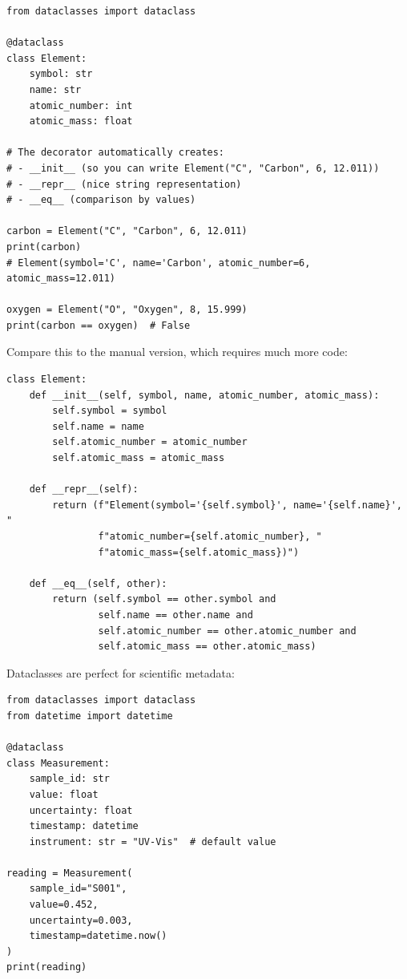 \begin{lstlisting}
from dataclasses import dataclass

@dataclass
class Element:
    symbol: str
    name: str
    atomic_number: int
    atomic_mass: float

# The decorator automatically creates:
# - __init__ (so you can write Element("C", "Carbon", 6, 12.011))
# - __repr__ (nice string representation)
# - __eq__ (comparison by values)

carbon = Element("C", "Carbon", 6, 12.011)
print(carbon)
# Element(symbol='C', name='Carbon', atomic_number=6, atomic_mass=12.011)

oxygen = Element("O", "Oxygen", 8, 15.999)
print(carbon == oxygen)  # False
\end{lstlisting}

Compare this to the manual version, which requires much more code:

\begin{lstlisting}
class Element:
    def __init__(self, symbol, name, atomic_number, atomic_mass):
        self.symbol = symbol
        self.name = name
        self.atomic_number = atomic_number
        self.atomic_mass = atomic_mass

    def __repr__(self):
        return (f"Element(symbol='{self.symbol}', name='{self.name}', "
                f"atomic_number={self.atomic_number}, "
                f"atomic_mass={self.atomic_mass})")

    def __eq__(self, other):
        return (self.symbol == other.symbol and
                self.name == other.name and
                self.atomic_number == other.atomic_number and
                self.atomic_mass == other.atomic_mass)
\end{lstlisting}

\begin{labexample}
Dataclasses are perfect for scientific metadata:

\begin{lstlisting}
from dataclasses import dataclass
from datetime import datetime

@dataclass
class Measurement:
    sample_id: str
    value: float
    uncertainty: float
    timestamp: datetime
    instrument: str = "UV-Vis"  # default value

reading = Measurement(
    sample_id="S001",
    value=0.452,
    uncertainty=0.003,
    timestamp=datetime.now()
)
print(reading)
\end{lstlisting}
\end{labexample}

